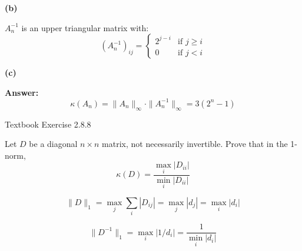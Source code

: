 \documentclass[reqno, answers]{exam}
\begin{document}
\begin{questions}

\begin{solution}
\textbf{(b)}

$A_n^{-1}$ is an upper triangular matrix with:
\[
(A_n^{-1})_{ij} = \begin{cases} 2^{j-i} & \text{if } j \geq i \\ 0 & \text{if } j < i \end{cases}
\]

\textbf{(c)}

\textbf{Answer:} 
\[
\boxed{\kappa(A_n) = \|A_n\|_\infty \cdot \|A_n^{-1}\|_\infty = 3(2^n - 1)}
\]
\end{solution}

\question Textbook Exercise 2.8.8

Let $D$ be a diagonal $n \times n$ matrix, not necessarily invertible. Prove that in the 1-norm,
\[
\kappa(D) = \frac{\max_i |D_{ii}|}{\min_i |D_{ii}|}
\]

\begin{solution}
\[
\|D\|_1 = \max_j \sum_i |D_{ij}| = \max_j |d_j| = \max_i |d_i|
\]

\[
\|D^{-1}\|_1 = \max_i |1/d_i| = \frac{1}{\min_i |d_i|}
\]
\end{solution}

\end{questions}
\end{document}
